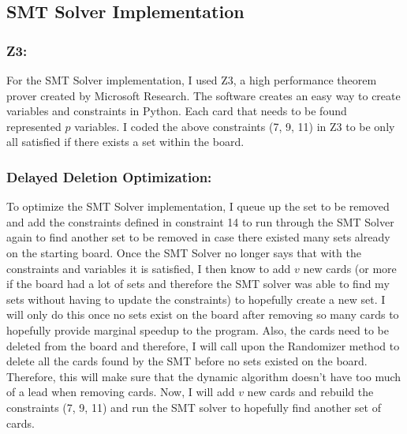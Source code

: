 \documentclass[pageno]{jpaper}
\begin{document}
\subsection{SMT Solver Implementation}


\subsubsection{Z3:}
For the SMT Solver implementation, I used Z3, a high performance theorem prover created by Microsoft Research. The software creates an easy way to create variables and constraints in Python. Each card that needs to be found represented $p$ variables. I coded the above constraints (7, 9, 11) in Z3 to be only all satisfied if there exists a set within the board. 


\subsubsection{Delayed Deletion Optimization:}

To optimize the SMT Solver implementation, I queue up the set to be removed and add the constraints defined in constraint 14 to run through the SMT Solver again to find another set to be removed in case there existed many sets already on the starting board. Once the SMT Solver no longer says that with the constraints and variables it is satisfied, I then know to add $v$ new cards (or more if the board had a lot of sets and therefore the SMT solver was able to find my sets without having to update the constraints) to hopefully create a new set. I will only do this once no sets exist on the board after removing so many cards to hopefully provide marginal speedup to the program. Also, the cards need to be deleted from the board and therefore, I will call upon the Randomizer method to delete all the cards found by the SMT before no sets existed on the board. Therefore, this will make sure that the dynamic algorithm doesn't have too much of a lead when removing cards. Now, I will add $v$ new cards and rebuild the constraints (7, 9, 11) and run the SMT solver to hopefully find another set of cards. 
\end{document}
